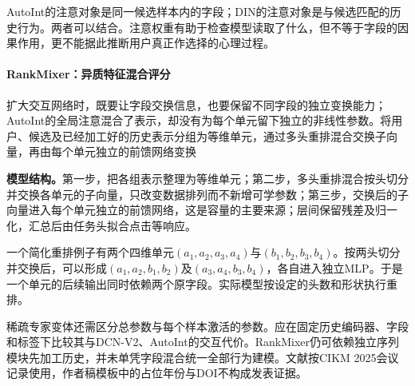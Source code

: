 AutoInt的注意对象是同一候选样本内的字段；DIN的注意对象是与候选匹配的历史行为。两者可以结合。注意权重有助于检查模型读取了什么，但不等于字段的因果作用，更不能据此推断用户真正作选择的心理过程。

\paragraph{RankMixer：异质特征混合评分}
\label{sec:rs-rankmixer}

扩大交互网络时，既要让字段交换信息，也要保留不同字段的独立变换能力；AutoInt的全局注意混合了表示，却没有为每个单元留下独立的非线性参数。将用户、候选及已经加工好的历史表示分组为等维单元，通过多头重排混合交换子向量，再由每个单元独立的前馈网络变换

\textbf{模型结构。}第一步，把各组表示整理为等维单元；第二步，多头重排混合按头切分并交换各单元的子向量，只改变数据排列而不新增可学参数；第三步，交换后的子向量进入每个单元独立的前馈网络，这是容量的主要来源；层间保留残差及归一化，汇总后由任务头拟合点击等响应。

一个简化重排例子有两个四维单元$(a_1,a_2,a_3,a_4)$与$(b_1,b_2,b_3,b_4)$。按两头切分并交换后，可以形成$(a_1,a_2,b_1,b_2)$及$(a_3,a_4,b_3,b_4)$，各自进入独立MLP。于是一个单元的后续输出同时依赖两个原字段。实际模型按设定的头数和形状执行重排。

稀疏专家变体还需区分总参数与每个样本激活的参数。应在固定历史编码器、字段和标签下比较其与DCN-V2、AutoInt的交互代价。RankMixer仍可依赖独立序列模块先加工历史，并未单凭字段混合统一全部行为建模。文献按CIKM 2025会议记录使用，作者稿模板中的占位年份与DOI不构成发表证据。

